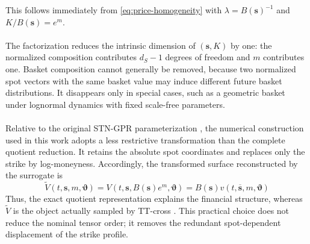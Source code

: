 \documentclass{article}
\numberwithin{equation}{subsection}
\theoremstyle{definition}
\theoremstyle{remark}
\begin{document}
This follows immediately from \eqref{eq:price-homogeneity} with
\(\lambda=B(\boldsymbol{s})^{-1}\) and
\(K/B(\boldsymbol{s})=e^m\).\\
\\
The factorization reduces the intrinsic dimension of
\((\boldsymbol{s},K)\) by one: the normalized composition contributes
\(d_S-1\) degrees of freedom and \(m\) contributes one. Basket composition
cannot generally be removed, because two normalized spot vectors with the same
basket value may induce different future basket distributions. It disappears
only in special cases, such as a geometric basket under lognormal dynamics
with fixed scale-free parameters.\\
\\
Relative to the original STN-GPR parameterization
\cite{Gribben2026STNGPR}, the numerical construction used in this work adopts
a less restrictive transformation than the complete quotient reduction. It
retains the absolute spot coordinates and replaces only the strike by
log-moneyness. Accordingly, the transformed surface reconstructed by the
surrogate is
\begin{equation}
\widetilde{V}
\left(
t,\boldsymbol{s},m,\boldsymbol{\vartheta}
\right)
=
V
\left(
t,\boldsymbol{s},B(\boldsymbol{s})e^m,\boldsymbol{\vartheta}
\right)
=
B(\boldsymbol{s})
v
\left(
t,\overline{\boldsymbol{s}},m,\boldsymbol{\vartheta}
\right)
\label{eq:transformed-pricing-surface}
\end{equation}
Thus, the exact quotient representation explains the financial structure,
whereas \(\widetilde V\) is the object actually sampled by TT-cross
\cite{oseledets2010ttcross}. This practical choice does not reduce the nominal
tensor order; it removes the redundant spot-dependent displacement of the
strike profile.
\end{document}
